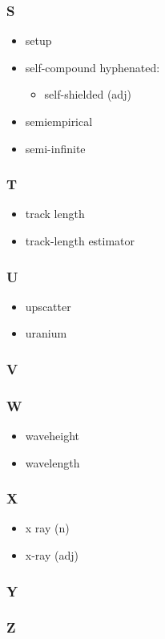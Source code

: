 \documentclass[10pt, letter]{article}
\begin{document}
\begin{multicols}{2}
\subsubsection*{S}
\begin{itemize}
\item setup
\item self-compound hyphenated:
  \begin{itemize}
  \item self-shielded (adj)
  \end{itemize}
\item semiempirical
\item semi-infinite
\end{itemize}

\subsubsection*{T}
\begin{itemize}
\item track length
\item track-length estimator
\end{itemize}
\subsubsection*{U}
\begin{itemize}
\item upscatter
\item uranium
\end{itemize}
\subsubsection*{V}
\subsubsection*{W}
\begin{itemize}
\item waveheight
\item wavelength
\end{itemize}

\subsubsection*{X}
\begin{itemize}
\item x ray (n) 
\item x-ray (adj)
\end{itemize}
\subsubsection*{Y}
\subsubsection*{Z}



\end{multicols}
\end{document}
